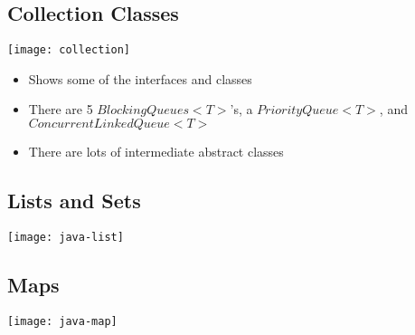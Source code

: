 
\begin{slide}
\section{Collection Classes}
\begin{center}
  \texttt{[image: collection]}
\end{center}
\begin{PauseHighLight}
  \begin{itemize}
  \item Shows some of the interfaces and classes\pause
  \item There are 5 \jl$BlockingQueues<T>$'s, a \jl$PriorityQueue<T>$, and
    \jl$ConcurrentLinkedQueue<T>$\pause
  \item  There are lots of intermediate abstract classes\pause
  \end{itemize}
\end{PauseHighLight}

\vspace{-1cm}

\vspace{-1cm}
\end{slide}


\begin{slide}
\section{Lists and Sets}
\pb
\pause
\begin{center}
  \texttt{[image: java-list]}\pause
\end{center}
\end{slide}


\begin{slide}
\section{Maps}
\vspace{-1cm}
\begin{center}
  \texttt{[image: java-map]}
\end{center}
\vspace{-1cm}
\end{slide}

